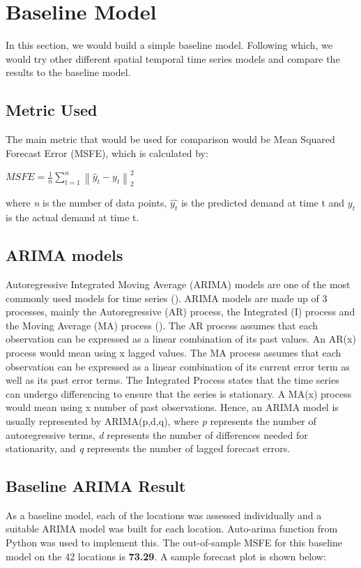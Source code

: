 \documentclass[12pt, letterpaper] {article}
\begin{document}
\section{Baseline Model}
In this section, we would build a simple baseline model. Following which, we would try other different spatial temporal time series models and compare the results to the baseline model. 

\subsection{Metric Used}
The main metric that would be used for comparison would be Mean Squared Forecast Error (MSFE), which is calculated by:

\begin{center}
    $\displaystyle MSFE=\frac{1}{n}\sum_{t=1}^{n}\left \| \hat{y}_{t} - y_{t} \right \|_{2}^{2}$
\end{center}
where \textit{n} is the number of data points, $\hat{y_t}$ is the predicted demand at time t and ${y_t}$ is the actual demand at time t.


\subsection{ARIMA models}
Autoregressive Integrated Moving Average (ARIMA) models are one of the most commonly used models for time series (\cite{Asha2016}). ARIMA models are made up of 3 processes, mainly the Autoregressive (AR) process, the Integrated (I) process and the Moving Average (MA) process (\cite{Jamal2018}). The AR process assumes that each observation can be expressed as a linear combination of its past values.  An AR(x) process would mean using x lagged values. The MA process assumes that each observation can be expressed as a linear combination of its current error term as well as its past error terms. The Integrated Process states that the time series can undergo differencing to ensure that the series is stationary. A MA(x) process would mean using x number of past observations. Hence, an ARIMA model is usually represented by ARIMA(p,d,q), where \textit{p} represents the number of autoregressive terms, \textit{d} represents the number of differences needed for stationarity, and \textit{q} represents the number of lagged forecast errors. 

\subsection{Baseline ARIMA Result}
As a baseline model, each of the locations was assessed individually and a suitable ARIMA model was built for each location. Auto-arima function from Python was used to implement this. The out-of-sample MSFE for this baseline model on the 42 locations is \textbf{73.29}. A sample forecast plot is shown below:
\end{document}
